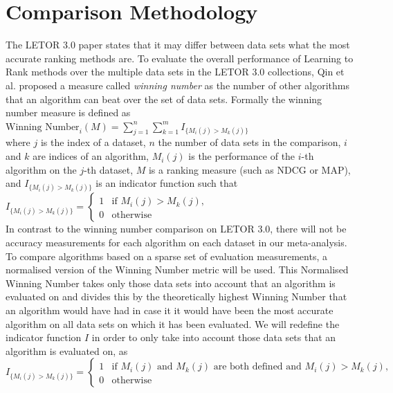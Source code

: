 \section{Comparison Methodology}
The LETOR 3.0 paper \cite{Qin2010} states that it may differ between data sets what the most accurate ranking methods are. To evaluate the overall performance of Learning to Rank methods over the multiple data sets in the LETOR 3.0 collections, Qin et al. \cite{Qin2010} proposed a measure called \emph{winning number} as the number of other algorithms that an algorithm can beat over the set of data sets. Formally the winning number measure is defined as\\

$\text{Winning Number}_i(M) = \sum\nolimits_{j=1}^n \sum\nolimits_{k=1}^m I_{\{M_i(j)>M_k(j)\}}$\\

where $j$ is the index of a dataset, $n$ the number of data sets in the comparison, $i$ and $k$ are indices of an algorithm, $M_i(j)$ is the performance of the $i$-th algorithm on the $j$-th dataset, $M$ is a ranking measure (such as \ac{NDCG} or \ac{MAP}), and $I_{\{M_i(j)>M_k(j)\}}$ is an indicator function such that\\

$I_{\{M_i(j)>M_k(j)\}} = \begin{cases}
1 & \text{if } M_i(j) > M_k(j), \\
0 & \text{otherwise}
\end{cases}$\\

In contrast to the winning number comparison on LETOR 3.0, there will not be accuracy measurements for each algorithm on each dataset in our meta-analysis. To compare algorithms based on a sparse set of evaluation measurements, a normalised version of the Winning Number metric will be used. This Normalised Winning Number takes only those data sets into account that an algorithm is evaluated on and divides this by the theoretically highest Winning Number that an algorithm would have had in case it it would have been the most accurate algorithm on all data sets on which it has been evaluated. We will redefine the indicator function $I$ in order to only take into account those data sets that an algorithm is evaluated on, as \\

$I_{\{M_i(j)>M_k(j)\}} = \begin{cases}
1 & \text{if } M_i(j) \text{ and } M_k(j) \text{ are both defined and } M_i(j) > M_k(j), \\
0 & \text{otherwise}
\end{cases}$\\

